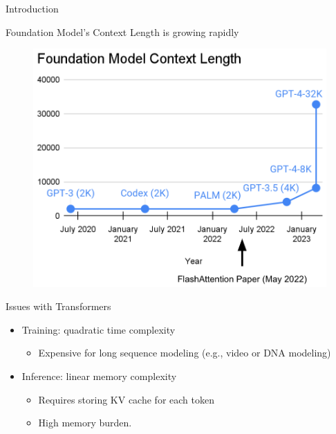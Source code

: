 
\frame{\titlepage}
\begin{frame}{}
    \centering
    \LARGE
    Introduction
    \end{frame}

\begin{frame}{Foundation Model's Context Length is growing rapidly}
    \begin{figure}
        \centering
        \includegraphics[width=0.75\linewidth]{figure/context.png}
    \end{figure}
\end{frame}

\begin{frame}{Issues with Transformers}

    \begin{itemize}
        \item Training: quadratic time complexity 
        \begin{itemize}
            \item Expensive for long sequence modeling (e.g., video or DNA modeling)
         \end{itemize}
        \item Inference: linear memory complexity
        \begin{itemize}
            \item Requires storing KV cache for each token
            \item High memory burden.
        \end{itemize}
    \end{itemize}    

\end{frame}

